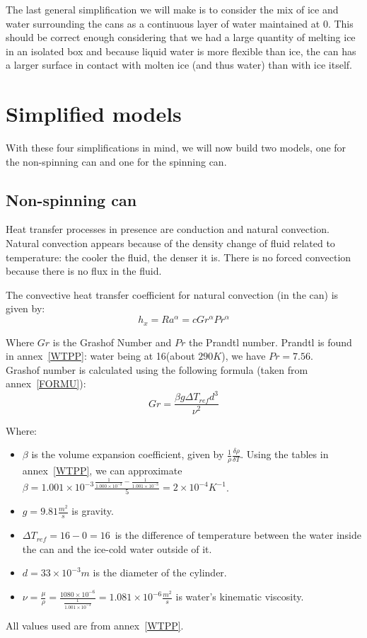 \documentclass{report}
\begin{document}
	The last general simplification we will make is to consider the mix of ice and water surrounding the cans as a continuous layer of water maintained at 0\textcelsius. This should be correct enough considering that we had a large quantity of melting ice in an isolated box and because liquid water is more flexible than ice, the can has a larger surface in contact with molten ice (and thus water) than with ice itself.
	
	
	\section{Simplified models}\label{sm}
	
	With these four simplifications in mind, we will now build two models, one for the non-spinning can and one for the spinning can.
	
	\subsection{Non-spinning can}\label{nrc}
	
	Heat transfer processes in presence are conduction and natural convection. Natural convection appears because of the density change of fluid related to temperature: the cooler the fluid, the denser it is. There is no forced convection because there is no flux in the fluid.
	
	The convective heat transfer coefficient for natural convection (in the can) is given by:
	\begin{equation}
		h_x=Ra^\alpha = cGr^\alpha Pr^\alpha
	\end{equation}
	
	Where $Gr$ is the Grashof Number and $Pr$ the Prandtl number. Prandtl is found in annex~\ref{WTPP}: water being at 16\textcelsius (about $290K$), we have $Pr=7.56$.\\
	Grashof number is calculated using the following formula (taken from annex~\ref{FORMU}):
	\begin{equation}
	Gr=\frac{\beta g \Delta T_{ref} d^3}{\nu^2}
	\end{equation}
	
	Where:
	\begin{itemize}
		\item $\beta$ is the volume expansion coefficient, given by $\frac{1}{\rho}\frac{\delta\rho}{\delta T}$. Using the tables in annex~\ref{WTPP}, we can approximate $\beta=1.001\times 10^{-3}\frac{\frac{1}{1.000\times 10^{-3}}-\frac{1}{1.001\times 10^{-3}}}{5}=2\times 10^{-4} K^{-1}$.
		\item $g=9.81\frac{m^2}{s}$ is gravity.
		\item $\Delta T_{ref}=16-0=16$\textcelsius\ is the difference of temperature between the water inside the can and the ice-cold water outside of it.
		\item $d=33\times 10^{-3}m$ is the diameter of the cylinder.
		\item $\nu=\frac{\mu}{\rho}=\frac{1080\times 10^{-6}}{\frac{1}{1.001\times 10^{-3}}}=1.081\times 10^{-6}\frac{m^2}{s}$ is water's kinematic viscosity.
	\end{itemize}
	All values used are from annex~\ref{WTPP}.
	
\end{document}
